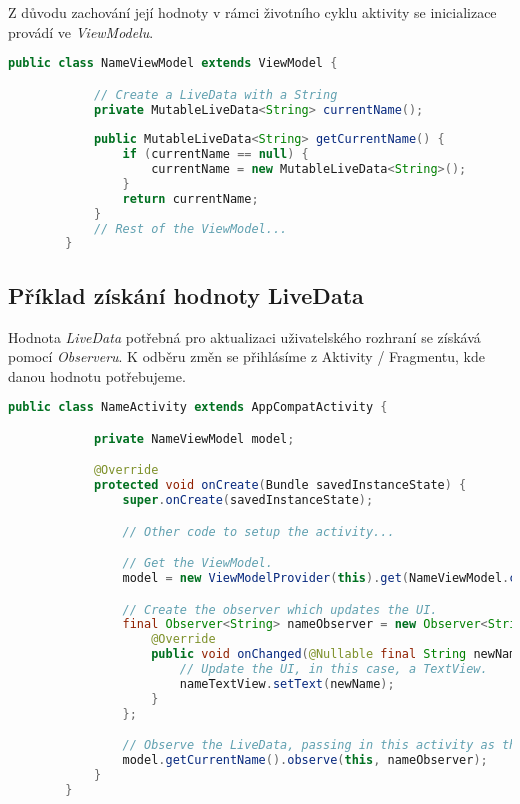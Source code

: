         Z důvodu zachování její hodnoty v rámci životního cyklu aktivity se inicializace provádí ve \emph{ViewModelu}.

        \begin{lstlisting}[language=Java, caption=Inicializace \emph{LiveData}~\cite{livedata}.]
        public class NameViewModel extends ViewModel {

            // Create a LiveData with a String
            private MutableLiveData<String> currentName();
            
            public MutableLiveData<String> getCurrentName() {
                if (currentName == null) {
                    currentName = new MutableLiveData<String>();
                }
                return currentName;
            }
            // Rest of the ViewModel...
        }
        \end{lstlisting}

        \newpage
        \subsection{Příklad získání hodnoty LiveData}
        Hodnota \emph{LiveData} potřebná pro aktualizaci uživatelského rozhraní se získává pomocí \emph{Observeru}. K odběru změn se přihlásíme z Aktivity / Fragmentu, kde danou hodnotu potřebujeme.

        \begin{lstlisting}[language=Java, caption=Získání hodnoty LiveData~\cite{livedata}]
        public class NameActivity extends AppCompatActivity {

            private NameViewModel model;

            @Override
            protected void onCreate(Bundle savedInstanceState) {
                super.onCreate(savedInstanceState);

                // Other code to setup the activity...

                // Get the ViewModel.
                model = new ViewModelProvider(this).get(NameViewModel.class);

                // Create the observer which updates the UI.
                final Observer<String> nameObserver = new Observer<String>() {
                    @Override
                    public void onChanged(@Nullable final String newName) {
                        // Update the UI, in this case, a TextView.
                        nameTextView.setText(newName);
                    }
                };

                // Observe the LiveData, passing in this activity as the LifecycleOwner and the observer.
                model.getCurrentName().observe(this, nameObserver);
            }
        }
        \end{lstlisting}
